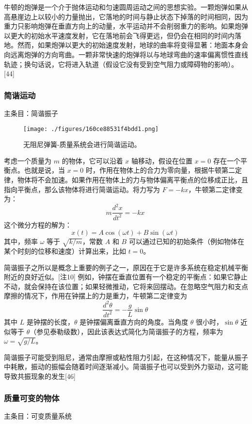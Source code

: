 牛顿的炮弹是一个介于抛体运动和匀速圆周运动之间的思想实验。一颗炮弹如果从高悬崖边上以较小的力量抛出，它落地的时间与静止状态下掉落的时间相同，因为重力只影响炮弹在垂直方向上的动量，水平运动并不会削弱重力的影响。如果炮弹以更大的初始水平速度发射，它在落地前会飞得更远，但仍会在相同的时间内落地。然而，如果炮弹以更大的初始速度发射，地球的曲率将变得显著：地面本身会向远离炮弹的方向弯曲。一颗非常快速的炮弹将以与地球弯曲的速率偏离惯性直线轨迹；换句话说，它将进入轨道（假设它没有受到空气阻力或障碍物的影响）。[44]
\subsubsection{简谐运动} 
主条目：简谐振子
\begin{figure}[ht]
\centering
\texttt{[image: ./figures/160ce88531f4bdd1.png]}
\caption{无阻尼弹簧-质量系统会进行简谐运动。} \label{fig_NEW01_6}
\end{figure}
考虑一个质量为 \( m \) 的物体，它可以沿着 \( x \) 轴移动，假设在位置 \( x = 0 \) 存在一个平衡点。也就是说，当 \( x = 0 \) 时，作用在物体上的合力为零向量，根据牛顿第二定律，物体将不会加速。如果作用在物体上的力与物体偏离平衡点的位移成正比，且指向平衡点，那么该物体将进行简谐运动。将力写为 \( F = -kx \)，牛顿第二定律变为：
\[
m \frac{d^2 x}{dt^2} = -kx~
\]
这个微分方程的解为：
\[
x(t) = A \cos(\omega t) + B \sin(\omega t)~
\]
其中，频率 \( \omega \) 等于 \( \sqrt{k/m} \)，常数 \( A \) 和 \( B \) 可以通过已知的初始条件（例如物体在某个时刻的位移和速度）计算出来，比如 \( t = 0\)。

简谐振子之所以是概念上重要的例子之一，原因在于它是许多系统在稳定机械平衡附近的良好近似。[注10] 例如，钟摆在垂直位置有一个稳定的平衡点：如果它静止不动，就会保持在该位置；如果轻微推动，它将来回摆动。在忽略空气阻力和支点摩擦的情况下，作用在钟摆上的力是重力，牛顿第二定律变为
\[
\frac{d^2 \theta}{dt^2} = -\frac{g}{L} \sin \theta~
\]
其中 \( L \) 是钟摆的长度，\( \theta \) 是钟摆偏离垂直方向的角度。当角度 \( \theta \) 很小时，\( \sin \theta \) 近似等于 \( \theta \)（参见泰勒级数），因此该表达式简化为简谐振子的方程，频率为\(\omega = \sqrt{g/L}\)。

简谐振子可能受到阻尼，通常由摩擦或粘性阻力引起，在这种情况下，能量从振子中耗散，振动的振幅会随着时间逐渐减小。简谐振子也可以受到外力驱动，这可能导致共振现象的发生[46]
\subsubsection{质量可变的物体}
主条目：可变质量系统